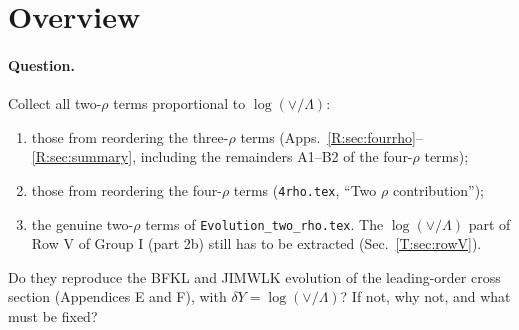 \documentclass[10pt]{article}
\numberwithin{equation}{section}
\begin{document}
\section{Overview}\label{T:sec:answer}

\paragraph{Question.} Collect all two-$\rho$ terms proportional to $\log(\vee/\Lambda)$:
\begin{enumerate}
\item those from reordering the three-$\rho$ terms (Apps.~\ref{R:sec:fourrho}--\ref{R:sec:summary}, including the remainders A1--B2 of the four-$\rho$ terms);
\item those from reordering the four-$\rho$ terms (\texttt{4rho.tex}, ``Two $\rho$ contribution'');
\item the genuine two-$\rho$ terms of \texttt{Evolution\_two\_rho.tex}. The $\log(\vee/\Lambda)$ part of Row V of Group I (part 2b) still has to be extracted (Sec.~\ref{T:sec:rowV}).
\end{enumerate}
Do they reproduce the BFKL and JIMWLK evolution of the leading-order cross section (Appendices E and F), with $\delta Y=\log(\vee/\Lambda)$? If not, why not, and what must be fixed?
\end{document}
